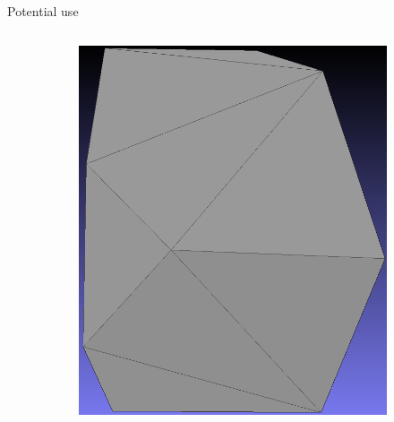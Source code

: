 \documentclass[10pt, export]{beamer}
\begin{document}
\begin{frame}{Potential use}
\begin{minipage}[0.2\textheight]{\textwidth}
\begin{columns}[T]
\begin{column}{0.48\textwidth}
{\begin{figure}
\begin{center}
\begin{subfigure}{.8\textwidth}
                                        \begin{flushright}
                                            \includegraphics[width=.4447\textwidth]{images/use/top_building_change_after}                                            
                                        \end{flushright}
                                    \end{subfigure}
                                \end{center}
                            \end{figure}
                        }
\end{column}
\end{columns}
\end{minipage}
\end{frame}
\end{document}
